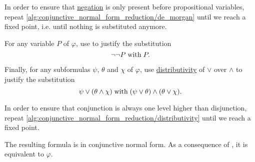 \begin{algorithm}
\begin{thmenum}
    In order to ensure that \hyperref[def:propositional_language/negation]{negation} is only present before propositional variables, repeat \ref{alg:conjunctive_normal_form_reduction/de_morgan} until we reach a fixed point, i.e. until nothing is substituted anymore.

     For any variable \( P \) of \( \varphi \), use  to justify the substitution
    \begin{equation*}
      \neg \neg P \T{with} P.
    \end{equation*}

     Finally, for any subformulas \( \psi \), \( \theta \) and \( \chi \) of \( \varphi \), use \hyperref[eq:def:semilattice/distributive_lattice/finite/join_over_meet]{distributivity} of \( \vee \) over \( \wedge \) to justify the substitution
    \begin{equation*}
      \psi \vee (\theta \wedge \chi) \T{with} (\psi \vee \theta) \wedge (\theta \vee \chi).
    \end{equation*}

    In order to ensure that conjunction is always one level higher than disjunction, repeat \ref{alg:conjunctive_normal_form_reduction/distributivity} until we reach a fixed point.
  \end{thmenum}

  The resulting formula is in conjunctive normal form. As a consequence of , it is equivalent to \( \varphi \).
\end{algorithm}
